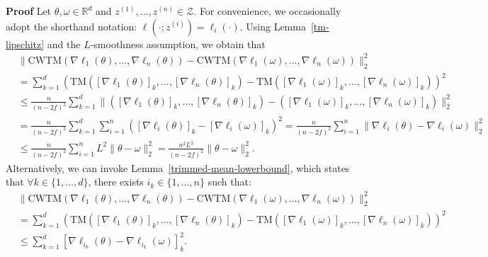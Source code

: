 \documentclass[twoside,11pt]{article}
\newcommand\mc{\mathcal}
\newcommand\mb{\mathbb}
\begin{document}
\textbf{Proof}\;
    Let $\theta, \omega \in \mb{R}^d$ and $z^{(1)}, \ldots, z^{(n)} \in \mc{Z}$. For convenience, we occasionally adopt the shorthand notation: $\ell(\cdot; z^{(i)}) = \ell_i(\cdot)$.
    Using Lemma~\ref{tm-lipschitz} and the $L$-smoothness assumption, we obtain that
    \begin{align}
        & \| \mathrm{CWTM}(\nabla \ell_1 (\theta), \ldots, \nabla \ell_n (\theta)) - \mathrm{CWTM}(\nabla \ell_1 (\omega), \ldots, \nabla \ell_n (\omega)) \|_2^2 \nonumber \\
        & = \sum_{k=1}^d {\left( \mathrm{TM}({\left[ \nabla \ell_1 (\theta) \right]}_k, \ldots, {\left[ \nabla \ell_n (\theta) \right]}_k) - \mathrm{TM}({\left[ \nabla \ell_1 (\omega) \right]}_k, \ldots, {\left[ \nabla \ell_n (\omega) \right]}_k) \right)}^2 \nonumber \\
        & \leq \frac{n}{{(n-2f)}^2} \sum_{k=1}^d \| ({\left[ \nabla \ell_1 (\theta) \right]}_k, \ldots, {\left[ \nabla \ell_n (\theta) \right]}_k) -  ({\left[ \nabla \ell_1 (\omega) \right]}_k, \ldots, {\left[ \nabla \ell_n (\omega) \right]}_k) \|_2^2 \nonumber \\
        & = \frac{n}{{(n-2f)}^2} \sum_{k=1}^d \sum_{i=1}^n {\left( {\left[ \nabla \ell_i (\theta) \right]}_k - {\left[ \nabla \ell_i (\omega) \right]}_k \right)}^2
        = \frac{n}{{(n-2f)}^2} \sum_{i=1}^n \| \nabla \ell_i (\theta) - \nabla \ell_i (\omega) \|_2^2 \nonumber \\
        & \leq \frac{n}{{(n-2f)}^2} \sum_{i=1}^n L^2 \| \theta - \omega \|_2^2
        = \frac{n^2 L^2}{{(n-2f)}^2} \| \theta - \omega \|_2^2 . \label{eqn:bnd_cwtm-1}
    \end{align}
    Alternatively, we can invoke Lemma~\ref{trimmed-mean-lowerbound}, which states that $\forall k \in \{1, \ldots, d\}$, there exists $i_k \in \{1, \ldots, n\}$ such that:
        \begin{align*}
        & \| \mathrm{CWTM}(\nabla \ell_1 (\theta), \ldots, \nabla \ell_n (\theta)) - \mathrm{CWTM}(\nabla \ell_1 (\omega), \ldots, \nabla \ell_n (\omega)) \|_2^2 \\
        & = \sum_{k=1}^d {\left( \mathrm{TM}({\left[ \nabla \ell_1 (\theta) \right]}_k, \ldots, {\left[ \nabla \ell_n (\theta) \right]}_k) - \mathrm{TM}({\left[ \nabla \ell_1 (\omega) \right]}_k, \ldots, {\left[ \nabla \ell_n (\omega) \right]}_k) \right)}^2 \\
        & \leq \sum_{k=1}^d {\left[ \nabla \ell_{i_k} (\theta) - \nabla \ell_{i_k} (\omega) \right]}_k^2.        
    \end{align*}
\end{document}

